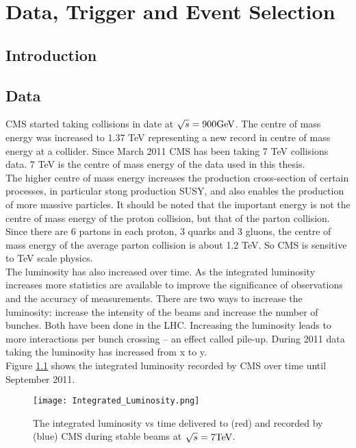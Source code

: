 \chapter{Data, Trigger and Event Selection}

\section{Introduction}

\section{Data}

CMS started taking collisions in date at $\sqrt{s} = 900 \mbox{GeV}$. The centre of
mass energy was increased to 1.37 TeV representing a new record in centre of
mass energy at a collider. Since March 2011 CMS has been taking 7 TeV 
collisions data. 7 TeV is the centre of mass energy of the data used in this 
thesis. \\

The higher centre of mass energy increases the production cross-section of
certain processes, in particular stong production SUSY, and also enables the
production of more massive particles. It should be noted that the important
energy is not the centre of mass energy of the proton collision, but that of the
parton collision. Since there are 6 partons in each proton, 3 quarks and 3
gluons, the centre of mass energy of the average parton collision is about 1.2
TeV. So CMS is sensitive to TeV scale physics. \\   

The luminosity has also increased over time. As the integrated luminosity 
increases more statistics are available to improve the significance of 
observations and the accuracy of measurements. There are two ways to increase 
the luminosity: increase the intensity of the beams and increase the number of
bunches. Both have been done in the LHC. Increasing the luminosity leads to
more interactions per bunch crossing -- an effect called pile-up. During 2011
data taking the luminosity has increased from x to y. \\

Figure \ref{fig:intlumi} shows the integrated luminosity recorded by CMS over 
time until September 2011. \\

\begin{figure}
\begin{center}
\texttt{[image: Integrated\_Luminosity.png]}
\caption{The integrated luminosity vs time delivered to (red) and recorded by
(blue) CMS during stable beams at $\sqrt{s} = 7 \mbox{TeV}$.}
\end{center}
\label{fig:intlumi}
\end{figure}

